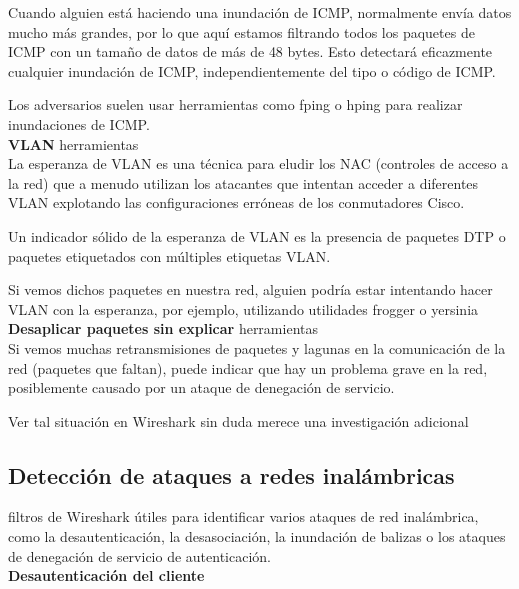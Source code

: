 Cuando alguien está haciendo una inundación de ICMP, normalmente envía datos mucho más grandes, por lo que aquí estamos filtrando todos los paquetes de ICMP con un tamaño de datos de más de 48 bytes. Esto detectará eficazmente cualquier inundación de ICMP, independientemente del tipo o código de ICMP.

Los adversarios suelen usar herramientas como fping o hping para realizar inundaciones de ICMP.\\

\textbf{VLAN}	 herramientas	\\
La esperanza de VLAN es una técnica para eludir los NAC (controles de acceso a la red) que a menudo utilizan los atacantes que intentan acceder a diferentes VLAN explotando las configuraciones erróneas de los conmutadores Cisco.

Un indicador sólido de la esperanza de VLAN es la presencia de paquetes DTP o paquetes etiquetados con múltiples etiquetas VLAN.

Si vemos dichos paquetes en nuestra red, alguien podría estar intentando hacer VLAN con la esperanza, por ejemplo, utilizando utilidades frogger o yersinia\\



\textbf{Desaplicar paquetes sin explicar	}	 herramientas	\\
Si vemos muchas retransmisiones de paquetes y lagunas en la comunicación de la red (paquetes que faltan), puede indicar que hay un problema grave en la red, posiblemente causado por un ataque de denegación de servicio.

Ver tal situación en Wireshark sin duda merece una investigación adicional\\

\subsection{Detección de ataques a redes inalámbricas}
filtros de Wireshark útiles para identificar varios ataques de red inalámbrica, como la desautenticación, la desasociación, la inundación de balizas o los ataques de denegación de servicio de autenticación.\\

\textbf{Desautenticación del cliente}		\\


